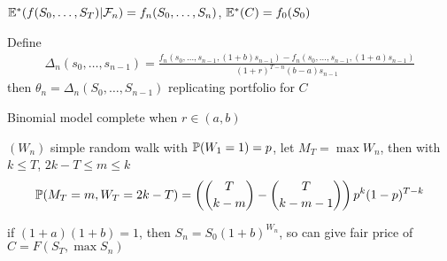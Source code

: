 \begin{prop}
    $\mathbb{E}^*(f(S_0, \dots, S_T) | \mathcal{F}_n) = f_n(S_0, \dots, S_n)$, $\mathbb{E}^*(C) = f_0(S_0)$
\end{prop}

\begin{prop}
    Define
    \begin{align*}
        \Delta_n(s_0, \dots, s_{n-1}) = \frac{f_n(s_0, \dots, s_{n-1}, (1 + b)s_{n-1}) - f_n(s_0, \dots, s_{n-1}, (1 + a)s_{n-1})}{(1+r)^{T-n}(b-a)s_{n-1}}
    \end{align*}
    then $\theta_n = \Delta_n(S_0, \dots, S_{n-1})$ replicating portfolio for $C$
\end{prop}

\begin{fact}
    Binomial model complete when $ r \in (a, b)$
\end{fact}

\begin{prop}
    $(W_n)$ simple random walk with $\mathbb{P}(W_1 = 1) = p$, let $M_T = \max W_n$, then with $k \leq T$, $2k - T \leq m \leq k$
    \begin{align*}
        \mathbb{P}(M_T = m, W_T = 2k - T) = \left( {T \choose k-m} - {T \choose k - m -1} \right)p^k(1-p)^{T-k}
    \end{align*}
\end{prop}

\begin{example}
    if $(1 + a)(1 + b) = 1$, then $S_n = S_0(1 + b)^{W_n}$, so can give fair price of $C = F(S_T, \max S_n)$
\end{example}

